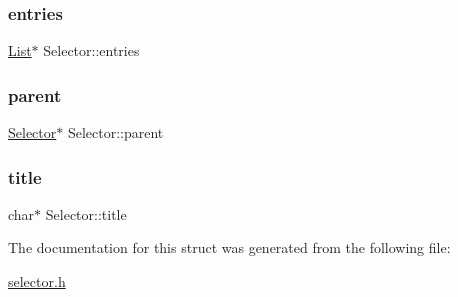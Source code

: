 \subsubsection{\texorpdfstring{entries}{entries}}
{\footnotesize\ttfamily \hyperlink{structList}{List}$\ast$ Selector\+::entries}

\mbox{\label{structSelector_a628decf5829be812d3817aa5c98ac0e3}} 
\subsubsection{\texorpdfstring{parent}{parent}}
{\footnotesize\ttfamily \hyperlink{structSelector}{Selector}$\ast$ Selector\+::parent}

\mbox{\label{structSelector_acbfa3c726e4642bb73866e111c977580}} 
\subsubsection{\texorpdfstring{title}{title}}
{\footnotesize\ttfamily char$\ast$ Selector\+::title}



The documentation for this struct was generated from the following file\+:\begin{DoxyCompactItemize}
\item 
\hyperlink{selector_8h}{selector.\+h}\end{DoxyCompactItemize}
